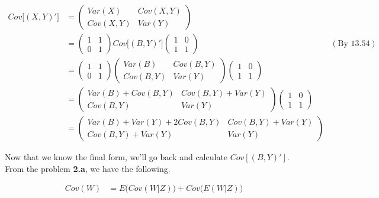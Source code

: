 \documentclass[12pt]{article}
\begin{document}
\begin{equation*}
	\begin{aligned}
	Cov\big[(X,Y)'\big] &= \left(
		\begin{array}{cc}
			Var(X) & Cov(X,Y) \\
			Cov(X,Y) & Var(Y)
		\end{array}
	\right)\\
	&= \left(
		\begin{array}{cc}
			1 & 1\\
			0 & 1
		\end{array}
		\right)
		Cov\big[(B,Y)'\big]
		\left(
		\begin{array}{cc}
			1 & 0\\
			1 & 1
		\end{array}
		\right) & (\textrm{By 13.54}) \\
	&= \left(
		\begin{array}{cc}
			1 & 1\\
			0 & 1
		\end{array}
		\right)
		\left(
		\begin{array}{cc}
			Var(B) & Cov(B,Y) \\
			Cov(B,Y) & Var(Y)
		\end{array}
		\right)
		\left(
		\begin{array}{cc}
			1 & 0\\
			1 & 1
		\end{array}
		\right) \\
	&= \left(
		\begin{array}{cc}
			Var(B) + Cov(B,Y) & Cov(B,Y) + Var(Y)\\
			Cov(B,Y) & Var(Y)
		\end{array}
		\right)
		\left(
		\begin{array}{cc}
			1 & 0\\
			1 & 1
		\end{array}
		\right) \\
	&= \left(
		\begin{array}{cc}
			Var(B) + Var(Y) + 2Cov(B,Y) & Cov(B,Y) + Var(Y)\\
			Cov(B,Y) + Var(Y) & Var(Y)
		\end{array}
		\right)
	\end{aligned}
\end{equation*}

Now that we know the final form, we'll go back and calculate $Cov[(B,Y)']$. From the problem \textbf{2.a}, we have the following.

\begin{equation*}
	\begin{aligned}
	Cov(W) &= E\big(Cov(W|Z)\big) + Cov\big(E(W|Z)\big)\\
	\end{aligned}
\end{equation*}
\end{document}
